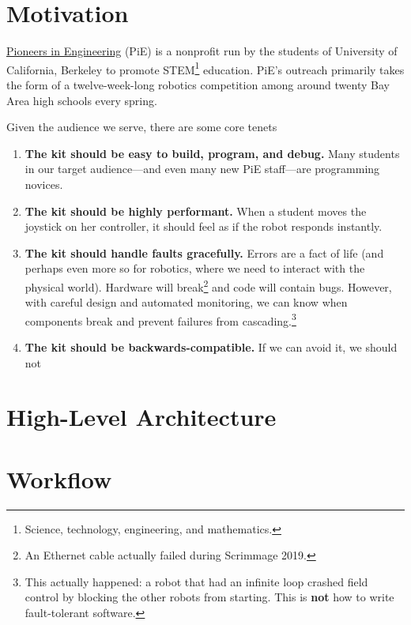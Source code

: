 \documentclass[12pt]{book}
\begin{document}
  \section{Motivation}

  \href{https://pierobotics.org}{Pioneers in Engineering} (PiE) is a nonprofit run by the students of University of California, Berkeley to promote STEM\footnote{Science, technology, engineering, and mathematics.} education.
  PiE's outreach primarily takes the form of a twelve-week-long robotics competition among around twenty Bay Area high schools every spring.

  Given the audience we serve, there are some core tenets

  \begin{enumerate}
    \item
      \textbf{The kit should be easy to build, program, and debug.}
      Many students in our target audience---and even many new PiE staff---are programming novices.

    \item
      \textbf{The kit should be highly performant.}
      When a student moves the joystick on her controller, it should feel as if the robot responds instantly.

    \item
      \textbf{The kit should handle faults gracefully.}
      Errors are a fact of life (and perhaps even more so for robotics, where we need to interact with the physical world).
      Hardware will break\footnote{An Ethernet cable actually failed during Scrimmage 2019.} and code will contain bugs.
      However, with careful design and automated monitoring, we can know when components break and prevent failures from cascading.\footnote{This actually happened: a robot that had an infinite loop crashed field control by blocking the other robots from starting. This is \textbf{not} how to write fault-tolerant software.}

    \item
      \textbf{The kit should be backwards-compatible.}
      If we can avoid it, we should not
  \end{enumerate}

  \section{High-Level Architecture}

  \section{Workflow}
\end{document}
